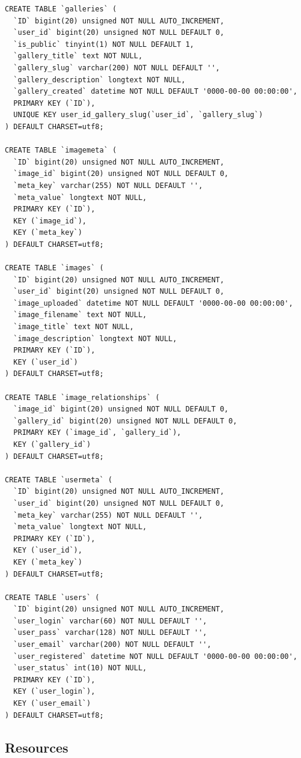 \documentclass[a4paper,12pt,oneside]{article} %
\begin{document}
\begin{lstlisting}
CREATE TABLE `galleries` (
  `ID` bigint(20) unsigned NOT NULL AUTO_INCREMENT,
  `user_id` bigint(20) unsigned NOT NULL DEFAULT 0,
  `is_public` tinyint(1) NOT NULL DEFAULT 1,
  `gallery_title` text NOT NULL,
  `gallery_slug` varchar(200) NOT NULL DEFAULT '',
  `gallery_description` longtext NOT NULL,
  `gallery_created` datetime NOT NULL DEFAULT '0000-00-00 00:00:00',
  PRIMARY KEY (`ID`),
  UNIQUE KEY user_id_gallery_slug(`user_id`, `gallery_slug`)
) DEFAULT CHARSET=utf8;

CREATE TABLE `imagemeta` (
  `ID` bigint(20) unsigned NOT NULL AUTO_INCREMENT,
  `image_id` bigint(20) unsigned NOT NULL DEFAULT 0,
  `meta_key` varchar(255) NOT NULL DEFAULT '',
  `meta_value` longtext NOT NULL,
  PRIMARY KEY (`ID`),
  KEY (`image_id`),
  KEY (`meta_key`)
) DEFAULT CHARSET=utf8;

CREATE TABLE `images` (
  `ID` bigint(20) unsigned NOT NULL AUTO_INCREMENT,
  `user_id` bigint(20) unsigned NOT NULL DEFAULT 0,
  `image_uploaded` datetime NOT NULL DEFAULT '0000-00-00 00:00:00',
  `image_filename` text NOT NULL,
  `image_title` text NOT NULL,
  `image_description` longtext NOT NULL,
  PRIMARY KEY (`ID`),
  KEY (`user_id`)
) DEFAULT CHARSET=utf8;

CREATE TABLE `image_relationships` (
  `image_id` bigint(20) unsigned NOT NULL DEFAULT 0,
  `gallery_id` bigint(20) unsigned NOT NULL DEFAULT 0,
  PRIMARY KEY (`image_id`, `gallery_id`),
  KEY (`gallery_id`)
) DEFAULT CHARSET=utf8;

CREATE TABLE `usermeta` (
  `ID` bigint(20) unsigned NOT NULL AUTO_INCREMENT,
  `user_id` bigint(20) unsigned NOT NULL DEFAULT 0,
  `meta_key` varchar(255) NOT NULL DEFAULT '',
  `meta_value` longtext NOT NULL,
  PRIMARY KEY (`ID`),
  KEY (`user_id`),
  KEY (`meta_key`)
) DEFAULT CHARSET=utf8;

CREATE TABLE `users` (
  `ID` bigint(20) unsigned NOT NULL AUTO_INCREMENT,
  `user_login` varchar(60) NOT NULL DEFAULT '',
  `user_pass` varchar(128) NOT NULL DEFAULT '',
  `user_email` varchar(200) NOT NULL DEFAULT '',
  `user_registered` datetime NOT NULL DEFAULT '0000-00-00 00:00:00',
  `user_status` int(10) NOT NULL,
  PRIMARY KEY (`ID`),
  KEY (`user_login`),
  KEY (`user_email`)
) DEFAULT CHARSET=utf8;
\end{lstlisting}





\subsection{Resources}
\end{document}
